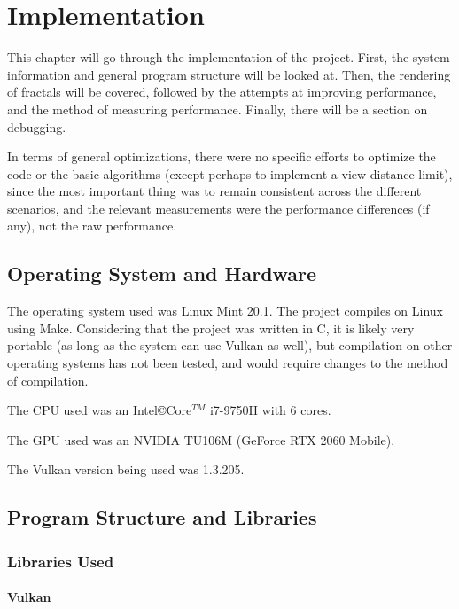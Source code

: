 \chapter{Implementation}
\label{chapter3}

This chapter will go through the implementation of the project. First, the system information and general program structure will be looked at. Then, the rendering of fractals will be covered, followed by the attempts at improving performance, and the method of measuring performance. Finally, there will be a section on debugging.\newline

In terms of general optimizations, there were no specific efforts to optimize the code or the basic algorithms (except perhaps to implement a view distance limit), since the most important thing was to remain consistent across the different scenarios, and the relevant measurements were the performance differences (if any), not the raw performance.

\section{Operating System and Hardware}

The operating system used was Linux Mint 20.1. The project compiles on Linux using Make. Considering that the project was written in C, it is likely very portable (as long as the system can use Vulkan as well), but compilation on other operating systems has not been tested, and would require changes to the method of compilation.\newline

The CPU used was an Intel\copyright Core$^{TM}$ i7-9750H with 6 cores.

The GPU used was an NVIDIA TU106M (GeForce RTX 2060 Mobile).

The Vulkan version being used was 1.3.205.

\section{Program Structure and Libraries}

\subsection{Libraries Used}

\subsubsection{Vulkan}

